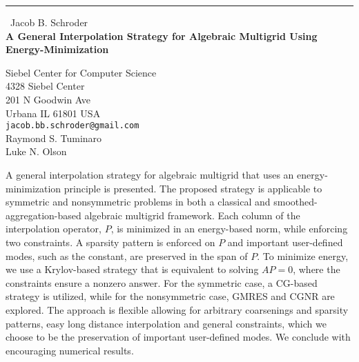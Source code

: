 \documentclass{report}
\begin{document}
\begin{center}
\rule{6in}{1pt} \
{\large Jacob B. Schroder \\
{\bf A General Interpolation Strategy for Algebraic Multigrid Using Energy-Minimization}}

Siebel Center for Computer Science \\ 4328 Siebel Center \\ 201 N Goodwin Ave \\ Urbana IL 61801 USA
\\
{\tt jacob.bb.schroder@gmail.com}\\
Raymond S. Tuminaro\\
Luke N. Olson\end{center}

A general interpolation strategy for algebraic multigrid that uses an
energy-minimization principle is presented. The proposed strategy is
applicable to symmetric and nonsymmetric problems in both a classical and
smoothed-aggregation-based algebraic multigrid framework. Each column of
the interpolation operator, $P$, is minimized in an energy-based norm,
while enforcing two constraints. A sparsity pattern is enforced on $P$
and important user-defined modes, such as the constant, are preserved in
the span of $P$. To minimize energy, we use a Krylov-based strategy that
is equivalent to solving $A P = 0$, where the constraints ensure a
nonzero answer. For the symmetric case, a CG-based strategy is utilized,
while for the nonsymmetric case, GMRES and CGNR are explored. The
approach is flexible allowing for arbitrary coarsenings and sparsity
patterns, easy long distance interpolation and general constraints, which
we choose to be the preservation of important user-defined modes. We
conclude with encouraging numerical results.
\end{document}
